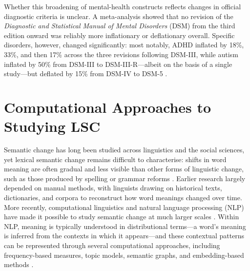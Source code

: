 Whether this broadening of mental-health constructs reflects changes in official diagnostic criteria is unclear. A meta-analysis showed that no revision of the \textit{Diagnostic and Statistical Manual of Mental Disorders} (DSM) from the third edition onward was reliably more inflationary or deflationary overall. Specific disorders, however, changed significantly: most notably, ADHD inflated by 18\%, 33\%, and then 17\% across the three revisions following DSM-III, while autism inflated by 50\% from DSM-III to DSM-III-R---albeit on the basis of a single study---but deflated by 15\% from DSM-IV to DSM-5 \citep{fabianoDiagnosticInflationDSM2020}.

\section{Computational Approaches to Studying LSC}

Semantic change has long been studied across linguistics and the social sciences, yet lexical semantic change remains difficult to characterise: shifts in word meaning are often gradual and less visible than other forms of linguistic change, such as those produced by spelling or grammar reforms \citep{saSurveyCharacterizingSemantic2026}. Earlier research largely depended on manual methods, with linguists drawing on historical texts, dictionaries, and corpora to reconstruct how word meanings changed over time. More recently, computational linguistics and natural language processing (NLP) have made it possible to study semantic change at much larger scales \citep{jm3}. Within NLP, meaning is typically understood in distributional terms---a word's meaning is inferred from the contexts in which it appears---and these contextual patterns can be represented through several computational approaches, including frequency-based measures, topic models, semantic graphs, and embedding-based methods \citep{saSurveyCharacterizingSemantic2026}.

